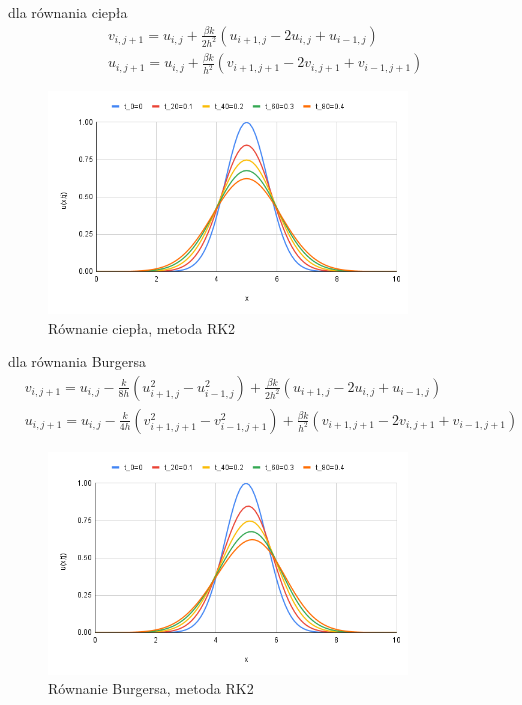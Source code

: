 \documentclass[a4paper,12pt]{article}
\begin{document}
dla równania ciepła
\begin{equation}
\begin{split}
& v_{i,j+1}=u_{i,j}+\frac{\beta k}{2h^{2}}(u_{i+1,j}-2u_{i,j}+u_{i-1,j})\\
& u_{i,j+1}=u_{i,j}+\frac{\beta k}{h^{2}}(v_{i+1,j+1}-2v_{i,j+1}+v_{i-1,j+1})
\end{split}
\end{equation}
\begin{figure}[h]
\caption{Równanie ciepła, metoda RK2}
\centering
\includegraphics[width=0.85\textwidth]{rys/6.png}
\end{figure}

dla równania Burgersa
\begin{equation}
\begin{split}
& v_{i,j+1}=u_{i,j}-\frac{k}{8h}(u_{i+1,j}^{2}-u_{i-1,j}^{2})+\frac{\beta k}{2h^{2}}(u_{i+1,j}-2u_{i,j}+u_{i-1,j})\\
& u_{i,j+1}=u_{i,j}-\frac{k}{4h}(v_{i+1,j+1}^{2}-v_{i-1,j+1}^{2})+\frac{\beta k}{h^{2}}(v_{i+1,j+1}-2v_{i,j+1}+v_{i-1,j+1})
\end{split}
\end{equation}
\begin{figure}[h]
\caption{Równanie Burgersa, metoda RK2}
\centering
\includegraphics[width=0.85\textwidth]{rys/7.png}
\end{figure}
\newpage
\end{document}
